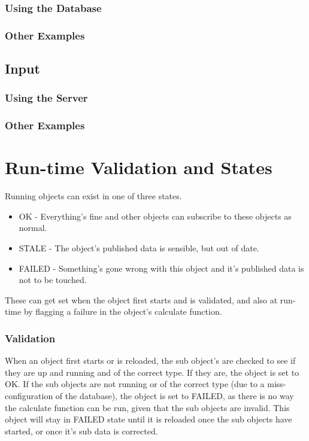\documentclass{report}
\begin{document}
\subsubsection{Using the Database}

\subsubsection{Other Examples}

\subsection{Input}

\subsubsection{Using the Server}

\subsubsection{Other Examples}

\section{Run-time Validation and States}

Running objects can exist in one of three states.

\begin{itemize}
\item OK - Everything's fine and other objects can subscribe to these objects as normal.
\item STALE - The object's published data is sensible, but out of date. 
\item FAILED - Something's gone wrong with this object and it's published data is not to be touched.
\end{itemize}

These can get set when the object first starts and is validated, and also at run-time by flagging a failure in the object's calculate function.

\subsubsection{Validation}

When an object first starts or is reloaded, the sub object's are checked to see if they are up and running and of the correct type. If they are, the object is set to OK. If the sub objects are not running or of the correct type (due to a miss-configuration of the database), the object is set to FAILED, as there is no way the calculate function can be run, given that the sub objects are invalid. This object will stay in FAILED state until it is reloaded once the sub objects have started, or once it's sub data is corrected.
\end{document}

